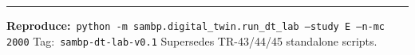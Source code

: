 \documentclass[10pt,a4paper]{article}
\begin{document}
\vspace{2pt}\textcolor{thesisblue!25}{\rule{\linewidth}{0.4pt}}
{\footnotesize\color{thesisgray}
\textbf{Reproduce:}~\texttt{python -m sambp.digital\_twin.run\_dt\_lab --study E --n-mc 2000}
\quad\textbar\quad Tag:~\texttt{sambp-dt-lab-v0.1}
\quad\textbar\quad Supersedes TR-43/44/45 standalone scripts.}
\end{document}
